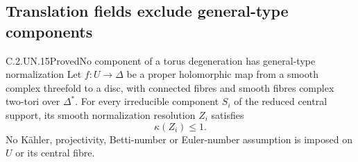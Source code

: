 \subsection{Translation fields exclude general-type components}

\begin{statement}{C.2.UN.15}{Proved}{No component of a torus degeneration has general-type normalization}
Let $f:U\to\Delta$ be a proper holomorphic map from
a smooth complex threefold to a disc, with connected
fibres and smooth fibres complex two-tori over
$\Delta^*$. For every irreducible component $S_i$
of the reduced central support, its smooth
normalization resolution $Z_i$ satisfies
\[
                            \kappa(Z_i)\le1.
 \tag{C.SC.1}
\]
No K\"ahler, projectivity, Betti-number or Euler-number
assumption is imposed on $U$ or its central fibre.
\end{statement}
